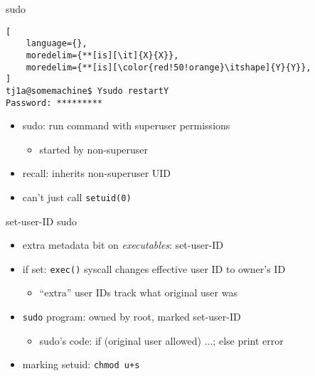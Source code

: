 \begin{frame}[fragile,label=sudoEx]{sudo}
\begin{lstlisting}[
    language={},
    moredelim={**[is][\it]{X}{X}},
    moredelim={**[is][\color{red!50!orange}\itshape]{Y}{Y}},
]
tj1a@somemachine$ Ysudo restartY
Password: *********
\end{lstlisting}
\begin{itemize}
\item sudo: run command with superuser permissions
    \begin{itemize}
    \item started by non-superuser
    \end{itemize}
\item recall: inherits non-superuser UID
\item can't just call \texttt{setuid(0)}
\end{itemize}
\end{frame}

\begin{frame}{set-user-ID sudo}
\begin{itemize}
\item extra metadata bit on \textit{executables}: set-user-ID
\item if set: \texttt{exec()} syscall changes effective user ID to owner's ID
    \begin{itemize}
    \item ``extra'' user IDs track what original user was
    \end{itemize}
\item \texttt{sudo} program: owned by root, marked set-user-ID
    \begin{itemize}
    \item sudo's code: if (original user allowed) ...; else print error
    \end{itemize}
\vspace{.5cm}
\item marking setuid: \texttt{chmod u+s}
\end{itemize}
\end{frame}

